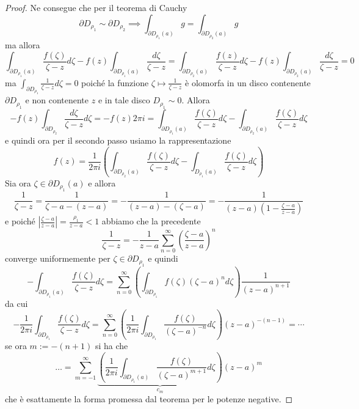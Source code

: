 \begin{proof}
    Ne consegue che per il teorema di Cauchy
    \[
        \partial D_{\rho_{1}} \sim \partial D_{\rho_{2}} \implies \int_{\partial
        D_{\rho_{1}}{(a)}} g = \int_{\partial D_{\rho_{2}}{(a)}} g
    \]
    ma allora
    \[
        \int_{\partial D_{\rho_{1}}{(a)}} \frac{f{(\zeta)}}{\zeta- z} d\zeta -
        f{(z)} \int_{\partial D_{\rho_{1}}{(a)}} \frac{d\zeta}{\zeta - z} = 
        \int_{\partial D_{\rho_{2}}{(a)}} \frac{f{(z)}}{\zeta - z} d\zeta -
        f{(z)} \int_{\partial D_{\rho_{2}}{(a)}} \frac{d\zeta}{\zeta - z} = 0
    \]
ma \(\displaystyle \int_{\partial D_{\rho_{1}}} \frac{1}{\zeta -z} d\zeta = 0\)
poiché la funzione \(\zeta \mapsto \frac{1}{\zeta -z}\) è olomorfa in un
disco contenente \(\partial D_{\rho_{1}} \) e non contenente \(z\) e in tale
disco \(D_{\rho_{1}} \sim 0\). Allora 
\[
- f{(z)} \int_{\partial D_{\rho_{2}}} \frac{d \zeta}{\zeta - z} d \zeta = -f{(z)} 2 \pi i = \int_{\partial D_{\rho_{1}}{(a)}} \frac{f{(\zeta)}}{\zeta
    - z} d\zeta - \int_{\partial D_{\rho_{2}}{(a)}} \frac{f{(\zeta)}}{\zeta - z}
    d \zeta
\]
e quindi ora per il secondo passo usiamo la rappresentazione
\[
    f{(z)} = \frac{1}{2\pi i} {\left( \int_{\partial D_{\rho_{2}} {(a)}}
    \frac{f{(\zeta)}}{\zeta -z} d \zeta - \int_{D_{\rho_{1}} {(a)}}
\frac{f{(\zeta)}}{\zeta - z} d \zeta \right)} 
\]
Sia ora \(\zeta \in \partial D_{\rho_{1}} {(a)}\) e allora
\[
    \frac{1}{\zeta -z} = \frac{1}{\zeta -a - {(z- a)}} = - \frac{1}{{(z-a)} -
    {(\zeta -a)}} = -\frac{1}{{(z-a)}{\left( 1 - \frac{\zeta-a}{z -a} \right)} }
\]
e poiché \(\left| \frac{\zeta -a}{z-a} \right|= \frac{\rho_{1}}{z-a}  < 1 \)
abbiamo che la precedente
\[
    \frac{1}{ \zeta -z } = -\frac{1}{z-a} \sum_{n=0}^{\infty} {\left(
    \frac{\zeta -a}{z- a} \right)} ^{n} 
\]
converge uniformemente per \(\zeta \in \partial D_{\rho_{1}} \) e quindi
\[
    - \int_{\partial D_{\rho_{1}}{(a)}} \frac{f{(\zeta)}}{\zeta - z} d \zeta =
    \sum_{n=0}^{\infty} {\left( \int_{\partial D_{\rho_{1}} }
    f{(\zeta)}{(\zeta-a)}^{n}d \zeta \right)}  \frac{1}{{(z-a)}^{n+1}}
\]
da cui
\[
    -\frac{1}{2\pi i} \int_{\partial D_{\rho_{1}} } \frac{f{(\zeta)}}{\zeta -
    z}d \zeta = \sum_{n=0}^{\infty} {\left( \frac{1}{2\pi i}\int_{\partial
    D_{\rho_{1}} } \frac{f{(\zeta)}}{{(\zeta -a)}^{-n}}d \zeta \right)}
    {(z-a)}^{-{(n-1)}} = \cdots
\]
se ora \( m := -{(n+1)}\) si ha che
\[
    \dots = \sum_{m=-1}^{\infty} \underbrace{\left(\frac{1}{2 \pi i } \int_{\partial
        D_{\rho_{1}}{\left( a \right)} } \frac{f{(\zeta)}}{{(\zeta -a)}^{m+1}}d
\zeta \right)}_{c_m}{(z-a)}^{m}
\]
che è esattamente la forma promessa dal teorema per le potenze negative.


\end{proof}
